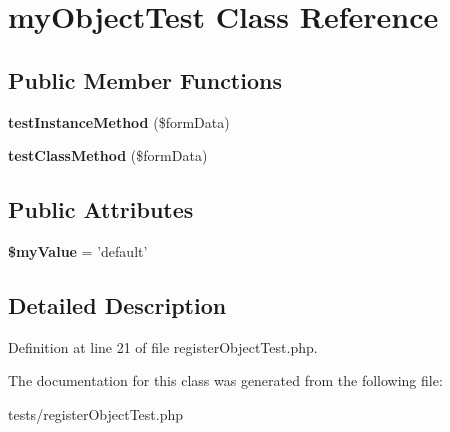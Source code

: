 \hypertarget{classmyObjectTest}{
\section{myObjectTest Class Reference}
\label{classmyObjectTest}
}
\subsection*{Public Member Functions}
\begin{DoxyCompactItemize}
\item 
\hypertarget{classmyObjectTest_adafdde58f99692a3dcae0a01be93ed31}{
{\bfseries testInstanceMethod} (\$formData)}
\label{classmyObjectTest_adafdde58f99692a3dcae0a01be93ed31}

\item 
\hypertarget{classmyObjectTest_a8f682192190d5eb75ac5fa6ad6a4131a}{
{\bfseries testClassMethod} (\$formData)}
\label{classmyObjectTest_a8f682192190d5eb75ac5fa6ad6a4131a}

\end{DoxyCompactItemize}
\subsection*{Public Attributes}
\begin{DoxyCompactItemize}
\item 
\hypertarget{classmyObjectTest_a21125490049ad3aea32b2aa9b41de124}{
{\bfseries \$myValue} = 'default'}
\label{classmyObjectTest_a21125490049ad3aea32b2aa9b41de124}

\end{DoxyCompactItemize}


\subsection{Detailed Description}


Definition at line 21 of file registerObjectTest.php.



The documentation for this class was generated from the following file:\begin{DoxyCompactItemize}
\item 
tests/registerObjectTest.php\end{DoxyCompactItemize}
